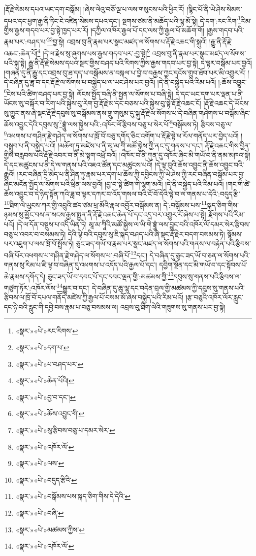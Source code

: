 །རྡོ་རྗེ་སེམས་དཔའ་ཡང་དག་བསྒོམ། །ཞེས་ལེའུ་བཅོ་ལྔ་པ་ལས་གསུངས་པའི་ཕྱིར་རོ། །སྙིང་པོ་ནི་ཡེ་ཤེས་སེམས་དཔའ་དང་ཕྱག་རྒྱ་ནི་ཏིང་ངེ་འཛིན་སེམས་དཔའ་དང་། སྔགས་ཙམ་ནི་མཆོད་པའི་ལྷ་མོ་སྟེ། དེ་དག་:རང་རིག་\footnote{«སྣར་»«པེ་»རང་རིགས་}རིམ་གྱིས་རྒྱས་གདབ་པར་བྱ་སྟེ་ཁྱད་པར་རོ། །དཀྱིལ་འཁོར་རྒྱལ་པོ་དང་ལས་ཀྱི་རྒྱལ་པོ་མཆོག་གོ། །རྒྱས་གདབ་པའི་རྣམ་པར་:བཤད་པ་\footnote{«སྣར་»«པེ་»དག་པ་}\footnote{«སྣར་»«པེ་»པ་བཤད་པར་}བྱ་སྟེ། འབྲས་བུ་ནི་རྣམ་པར་སྣང་མཛད་ལ་སོགས་པ་རྡོ་རྗེ་འཆང་གི་སྐུའོ། །རྒྱུ་ནི་རྡོ་རྗེ་འཆང་:ཆེན་པོ།\footnote{«སྣར་»«པེ་»ཆེན་པོའི།} །དེ་ལ་རྗེས་སུ་ཞུགས་པས་རྒྱས་གདབ་པར་:བྱ་སྟེ།\footnote{«སྣར་»«པེ་»བྱ་བ་དང་།} འབྲས་བུ་ནི་རྣམ་པར་སྣང་མཛད་ལ་སོགས་པའི་སྐུ་སྟེ། རྒྱུ་ནི་རྡོ་རྗེ་སེམས་དཔའ་སྔར་གྱིས་བཤད་པའི་རིགས་ཀྱིས་རྒྱས་གདབ་པར་བྱ་སྟེ། དེ་ལྟར་བསྒོམ་པར་བྱའོ། །གཞན་དུ་ནི་རྒྱུ་དང་འབྲས་བུ་ཐ་དད་པ་བསྒོམས་ན་བསྐལ་པ་བྱེ་བ་བརྒྱས་ཀྱང་དངོས་གྲུབ་ཐོབ་པར་མི་འགྱུར་རོ། །
དེ་བཞིན་དུ་ཟླ་བ་དང་རྡོ་རྗེ་ལ་སོགས་པ་བསྐྱེད་པ་ལ་ཡང་ཤེས་པར་བྱའོ། །དེ་ནི་བསྐྱེད་པའི་རིམ་པའོ། །:ཆོས་འབྱུང་\footnote{«སྣར་»«པེ་»ཆོས་འབྱུང་གི་}ངེས་པའི་ཚིག་བཤད་པར་བྱ་སྟེ། ལོངས་སྤྱོད་བཞི་ནི་སྤྱན་ལ་སོགས་པ་བཞི་སྟེ། དེ་དང་ཡང་དག་པར་ལྡན་པ་ནི་ཡོངས་སུ་བསྐོར་བ་རིག་པའི་སྐྱེས་བུ་རེག་བྱ་རྡོ་རྗེ་མ་དང་བཅས་པའི་སྐྱེས་བུ་སྟེ་རྡོ་རྗེ་འཆང་ངོ། །རྡོ་རྗེ་འཆང་དེ་ཡོངས་སུ་གྱུར་ནས་ཞེ་སྡང་རྡོ་རྗེ་དབུས་སུ་བསྒོམས་ནས་གྲུ་གསུམ་དུ་སྐུ་རྡོ་རྗེ་ལ་སོགས་པ་དེ་བཞིན་གཤེགས་པ་བསྒོམ་ཞིང་ཆོས་འབྱུང་དེའི་དབུས་སུ་\footnote{«སྣར་»«པེ་»སུ་རྩིབས་བཅུ་པ་དམར་སེར་}བྷྲཱུཾ་ལས་སྐྱེས་པའི་:འཁོར་ལོ་རྩིབས་བཅུ་པ་སེར་པོ་\footnote{«སྣར་»«པེ་»འཁོར་ལོ་}བསྒོམས་ཏེ། རྩིབས་བཅུ་ལ་\footnote{«སྣར་»«པེ་»ལས་}འཕགས་པ་གཤིན་རྗེ་གཤེད་ལ་སོགས་པ་ཁྲོ་བོ་བཅུ་དགོད་ཅིང་འགོག་པ་རྡོ་རྗེ་སྟེ་ཕ་རོལ་གནོད་པར་བྱེད་པའོ། །བསྒྲུབ་པ་ནི་བསྐྱེད་པའོ། །མཆོག་ཏུ་མཛེས་པ་ནི་མཱ་མ་ཀཱི་མཚོ་སྐྱེས་ཀྱི་ནང་དུ་གནས་པ་དང་། རྡོ་རྗེ་འཆང་གིས་བྱིན་གྱིས་བརླབས་པའི་རྡོ་རྗེ་འབར་བ་ནི་མེ་སྟག་འཕྲོ་བའོ། །འཁོར་བ་ནི་ཀུན་དུ་འཁོར་ཞིང་མི་གཡོ་བ་ནི་ནམ་མཁའ་སྟེ། དེ་དང་མཚུངས་པ་ནི་དེ་ལ་གནས་པའི་འཇའ་ཚོན་དང་མཚུངས་པའོ། །དེ་ལྟ་བུའི་ཆོས་འབྱུང་ནི་ཆོས་འབྱུང་བའི་རྒྱུའོ། །རང་བཞིན་དྲི་མེད་པ་ནི་ཤིན་ཏུ་རྣམ་པར་དག་པ་ཆོས་ཀྱི་དབྱིངས་ཀྱི་ཡེ་ཤེས་ཀྱི་རང་བཞིན་བསྒོམ་པར་བྱ་ཞིང་མངོན་སྤྱོད་ལ་སོགས་པའི་ཕྲིན་ལས་བྱའོ། །བྱ་བ་སྟེ་ཚིག་གི་ལྷག་མའོ། །དེ་ནི་བསྐྱེད་པའི་རིམ་པའོ། །གང་གི་ཚེ་ཆོས་འབྱུང་བ་དེ་ཉིད་སྟོན་ཀའི་ཟླ་བ་ལྟར་དཀར་བ་འོད་གསལ་བའི་ངོ་བོ་དེའི་ལྟེ་བ་ལ་གནས་པ་དེའི་:བདུད་རྩི་\footnote{«སྣར་»«པེ་»བདུད་རྩིའི་}ཐིག་ལེ་ཡུངས་ཀར་གྱི་འབྲུའི་ཚད་ཙམ་ཕྲ་མོའི་རྣལ་འབྱོར་བསྒོམས་ན། དེ་:བསྒོམས་པས་\footnote{«སྣར་»«པེ་»བསྒོམས་པས་སྐད་ཅིག་གིས་དེ་དེའི་}སྐད་ཅིག་གིས་ཉམས་སུ་མྱོང་བས་ན་སངས་རྒྱས་སྤྱན་ནི་རྡོ་རྗེ་འཆང་ཆེན་པོ་དང་འདྲ་བར་འགྱུར་རོ་ཞེས་པ་སྟེ། རྫོགས་པའི་རིམ་པའོ། །དེ་ལ་དོན་བསྡུས་པ་འདི་ཡིན་ཏེ། མཱ་མ་ཀཱིའི་མཚོ་སྐྱེས་ལ་ཡི་གེ་བྷྲཱུཾ་ལས་བྱུང་བའི་འཁོར་ལོ་དམར་སེར་རྩིབས་བཅུ་པ་འབར་བ་བསམས་ཏེ། དེའི་ལྟེ་བའི་དབུས་སུ་ཇི་སྐད་བཤད་པའི་ཞེ་སྡང་རྡོ་རྗེར་བདག་བསམས་ཏེ། སྙོམས་པར་འཇུག་པ་ལས་ཁྲོ་བོ་སྤྲོས་ཏེ། ཅུང་ཟད་གཡོ་བ་རྣམ་པར་སྣང་མཛད་ལ་སོགས་པའི་གནས་ལ་བརྟེན་པའི་རྩིབས་བཞི་པོར་འཕགས་པ་གཤིན་རྗེ་གཤེད་ལ་སོགས་པ་:བཞི་པོ་\footnote{«སྣར་»«པེ་»བཞི་}དང་། དེ་བཞིན་དུ་ཅུང་ཟད་ཡོ་བ་ཅན་ལ་སོགས་པའི་གནས་སུ་རིམ་པ་ཇི་ལྟ་བ་བཞིན་དུ་འཕགས་པ་འདོད་པའི་རྒྱལ་པོ་དང་། དབྱིག་སྔོན་དང་མི་གཡོ་བ་དང་སྟོབས་པོ་ཆེ་རྣམས་དགོད་དེ། ཅུང་ཟད་ཡོ་བ་དབང་པོ་དང་དབང་ལྡན་གྱི་:མཚམས་ཀྱི་\footnote{«སྣར་»«པེ་»མཚམས་ཀྱིས་}དབུས་སུ་གནས་པའི་རྩིབས་ལ་གཙུག་ཏོར་:འཁོར་ལོས་\footnote{«སྣར་»«པེ་»འཁོར་ལོ་}སྒྱུར་བ་དང་། དེ་བཞིན་དུ་ཆུ་ལྷ་དང་བདེན་བྲལ་གྱི་མཚམས་ཀྱི་དབུས་སུ་གནས་པའི་རྩིབས་ལ་ཁྲོ་བོ་དཔལ་གནོད་མཛེས་ཀྱི་རྒྱལ་པོ་བསམ་མོ་ཞེས་བསྐྱེད་པའི་རིམ་པའོ། །རྩ་བཅུའི་འཁོར་ལོར་རླུང་དང་ཉེ་བའི་རླུང་གི་དབྱེ་བས་རྣམ་པ་བཅུ་བསམས་ལ། འབྲས་བུ་ཐིག་ལེའི་གཟུགས་སུ་གནས་པར་བྱ་སྟེ། 